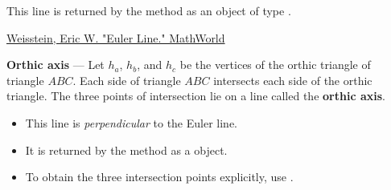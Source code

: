 \noindent
This line is returned by the method  as an object of type .

\begin{flushright}
\small
\href{https://mathworld.wolfram.com/EulerLine.html}{Weisstein, Eric W. "Euler Line." MathWorld}
\end{flushright}

\medskip
\noindent
\textbf{Orthic axis} — Let $h_a$, $h_b$, and $h_c$ be the vertices of the orthic triangle of triangle $ABC$. Each side of triangle $ABC$ intersects each side of the orthic triangle. The three points of intersection lie on a line called the \textbf{orthic axis}.

\begin{itemize}
  \item This line is \emph{perpendicular} to the Euler line.
  \item It is returned by the method  as a  object.
  \item To obtain the three intersection points explicitly, use .
\end{itemize}


\vspace{1em}


